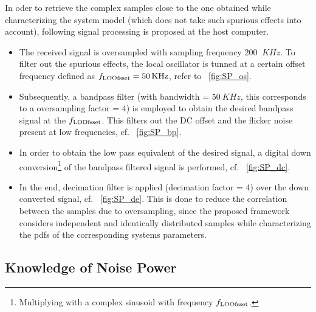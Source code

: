 In oder to retrieve the complex samples close to the one obtained while characterizing the system model (which does not take such spurious effects into account), following signal processing is proposed at the host computer.\begin{itemize}
\item The received signal is oversampled with sampling frequency $200$ $\SI{}{KHz}$. 
To filter out the spurious effects, the local oscillator is tunned at a certain offset frequency defined as $f_{\text{LOOfsset}} = \SI{50}{KHz}$, refer to \figurename~\ref{fig:SP_os}. 
\item Subsequently, a bandpass filter (with bandwidth = $\SI{50}{KHz}$, this corresponds to a oversampling factor = $4$) is employed to obtain the desired bandpass signal at the $f_{\text{LOOfsset}}$. This filters out the DC offset and the flicker noise present at low frequencies, cf. \figurename~\ref{fig:SP_bp}. 
\item In order to obtain the low pass equivalent of the desired signal, a digital down conversion\footnote{Multiplying with a complex sinusoid with frequency $f_{\text{LOOfsset}}$.} of the bandpass filtered signal is performed, cf. \figurename~\ref{fig:SP_dc}. %
\item In the end, decimation filter is applied (decimation factor = 4) over the down converted signal, cf. \figurename~\ref{fig:SP_de}. This is done to reduce the correlation between the samples due to oversampling, since the proposed framework considers independent and identically distributed samples while characterizing the pdfs of the corresponding systems parameters. 
\end{itemize}

\subsection{Knowledge of Noise Power}

